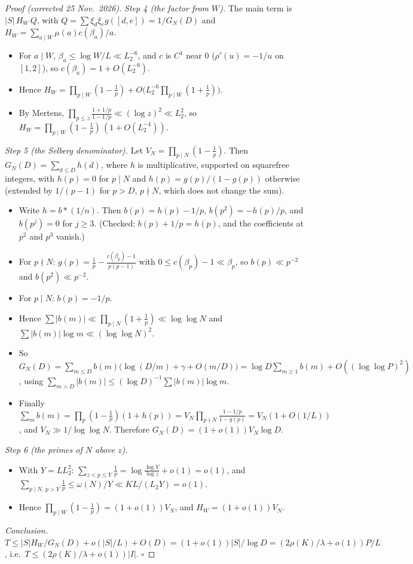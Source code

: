 \documentclass[11pt,a4paper]{article}
\theoremstyle{remark}
\begin{document}
\begin{proof}[Proof (corrected 25 Nov.~2026)]
\emph{Step 4 (the factor from $W$).} The main term is $|S|\,H_W\,Q$, with $Q=\sum\xi_d\xi_eg([d,e])=1/G_N(D)$ and
$H_W=\sum_{a\mid W}\mu(a)c(\beta_a)/a$.
\begin{itemize}
\item For $a\mid W$, $\beta_a\le\log W/L\ll L_2^{-6}$, and $c$ is $C^1$ near $0$ ($\rho'(u)=-1/u$ on $[1,2]$), so $c(\beta_a)=1+O(L_2^{-6})$.
\item Hence $H_W=\prod_{p\mid W}(1-\frac1p)+O\bigl(L_2^{-6}\prod_{p\mid W}(1+\frac1p)\bigr)$.
\item By Mertens, $\prod_{p\le z}\frac{1+1/p}{1-1/p}\ll(\log z)^2\ll L_2^2$, so $H_W=\prod_{p\mid W}(1-\frac1p)\,(1+O(L_2^{-4}))$.
\end{itemize}

\emph{Step 5 (the Selberg denominator).} Let $V_N=\prod_{p\mid N}(1-\frac1p)$. Then
$G_N(D)=\sum_{d\le D}h(d)$, where $h$ is multiplicative, supported on squarefree integers, with $h(p)=0$ for $p\mid N$ and
$h(p)=g(p)/(1-g(p))$ otherwise (extended by $1/(p-1)$ for $p>D$, $p\nmid N$, which does not change the sum).
\begin{itemize}
\item Write $h=b*(1/n)$. Then $b(p)=h(p)-1/p$, $b(p^2)=-h(p)/p$, and $b(p^j)=0$ for $j\ge3$. (Checked: $b(p)+1/p=h(p)$, and the
coefficients at $p^2$ and $p^3$ vanish.)
\item For $p\nmid N$: $g(p)=\frac1p-\frac{c(\beta_p)-1}{p(p-1)}$ with $0\le c(\beta_p)-1\ll\beta_p$, so $b(p)\ll p^{-2}$ and $b(p^2)\ll p^{-2}$.
\item For $p\mid N$: $b(p)=-1/p$.
\item Hence $\sum|b(m)|\ll\prod_{p\mid N}(1+\frac1p)\ll\log\log N$ and $\sum|b(m)|\log m\ll(\log\log N)^2$.
\item So $G_N(D)=\sum_{m\le D}b(m)\bigl(\log(D/m)+\gamma+O(m/D)\bigr)=\log D\sum_{m\ge1}b(m)+O((\log\log P)^2)$, using
$\sum_{m>D}|b(m)|\le(\log D)^{-1}\sum|b(m)|\log m$.
\item Finally $\sum_mb(m)=\prod_p(1-\frac1p)(1+h(p))=V_N\prod_{p\nmid N}\frac{1-1/p}{1-g(p)}=V_N(1+O(1/L))$, and
$V_N\gg1/\log\log N$. Therefore $G_N(D)=(1+o(1))V_N\log D$.
\end{itemize}

\emph{Step 6 (the primes of $N$ above $z$).}
\begin{itemize}
\item With $Y=LL_2^2$: $\sum_{z<p\le Y}\frac1p=\log\frac{\log Y}{\log z}+o(1)=o(1)$, and $\sum_{p\mid N,\,p>Y}\frac1p\le\omega(N)/Y\ll KL/(L_2Y)=o(1)$.
\item Hence $\prod_{p\mid W}(1-\frac1p)=(1+o(1))V_N$, and $H_W=(1+o(1))V_N$.
\end{itemize}

\emph{Conclusion.} $T\le|S|H_W/G_N(D)+o(|S|/L)+O(D)=(1+o(1))|S|/\log D=(2\rho(K)/\lambda+o(1))P/L$, i.e.\
$T\le(2\rho(K)/\lambda+o(1))|I|$. $\square$
\end{proof}
\end{document}
